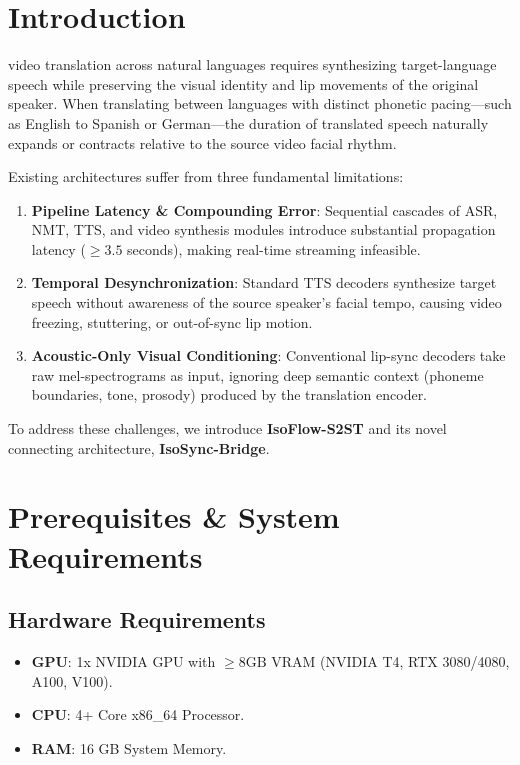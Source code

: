 \documentclass[10pt,journal,compsoc]{IEEEtran}
\begin{document}
\section{Introduction}
 video translation across natural languages requires synthesizing target-language speech while preserving the visual identity and lip movements of the original speaker. When translating between languages with distinct phonetic pacing—such as English to Spanish or German—the duration of translated speech naturally expands or contracts relative to the source video facial rhythm.

Existing architectures suffer from three fundamental limitations:
\begin{enumerate}
    \item \textbf{Pipeline Latency \& Compounding Error}: Sequential cascades of ASR, NMT, TTS, and video synthesis modules introduce substantial propagation latency ($\ge 3.5$ seconds), making real-time streaming infeasible.
    \item \textbf{Temporal Desynchronization}: Standard TTS decoders synthesize target speech without awareness of the source speaker's facial tempo, causing video freezing, stuttering, or out-of-sync lip motion.
    \item \textbf{Acoustic-Only Visual Conditioning}: Conventional lip-sync decoders take raw mel-spectrograms as input, ignoring deep semantic context (phoneme boundaries, tone, prosody) produced by the translation encoder.
\end{enumerate}

To address these challenges, we introduce \textbf{IsoFlow-S2ST} and its novel connecting architecture, \textbf{IsoSync-Bridge}.

\section{Prerequisites \& System Requirements}

\subsection{Hardware Requirements}
\begin{itemize}
    \item \textbf{GPU}: 1x NVIDIA GPU with $\ge 8\text{GB}$ VRAM (NVIDIA T4, RTX 3080/4080, A100, V100).
    \item \textbf{CPU}: 4+ Core x86\_64 Processor.
    \item \textbf{RAM}: 16 GB System Memory.
\end{itemize}
\end{document}
